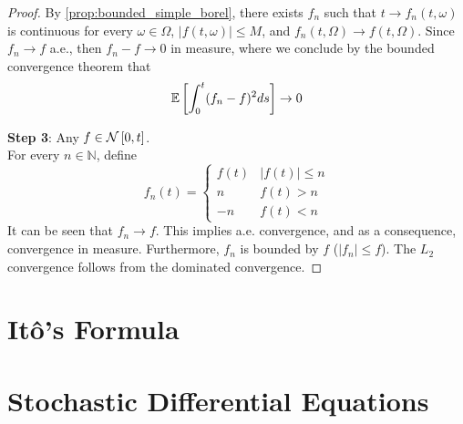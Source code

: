 \documentclass[../TGMAFFIRO.tex]{subfiles}
\begin{document}
\begin{proposition}
\begin{proof}
By \ref{prop:bounded_simple_borel}, there exists $f_n$ such that $t\to f_n(t,\omega)$ is continuous for every $\omega\in\Omega$, $|f(t,\omega)|\leq M$, and $f_n(t,\Omega) \to f(t,\Omega)$. Since $f_n\to f$ a.e., then $f_n - f \to 0$ in measure, where we conclude by the bounded convergence theorem that
	\begin{equation}
		\mathbb{E}\left[\int_0^t(f_n - f)^2 ds\right] \to 0
	\end{equation}

\textbf{Step 3}: Any $f\in\mathcal{N}\left[0, t\right]$.\\
For every $n\in\mathbb{N}$, define
	\begin{equation}
		f_n(t) = \begin{cases}
					f(t) & |f(t)|\leq n\\
					n 	 & f(t) > n \\
					-n   & f(t) < n
			     \end{cases}
	\end{equation}
It can be seen that $f_n\to f$. This implies a.e. convergence, and as a consequence, convergence in measure. Furthermore, $f_n$ is bounded by $f$ ($|f_n| \leq f$). The $L_2$ convergence follows from the dominated convergence.
\end{proof}

\end{proposition}

\section{It\^o's Formula}
\section{Stochastic Differential Equations}
\end{document}
